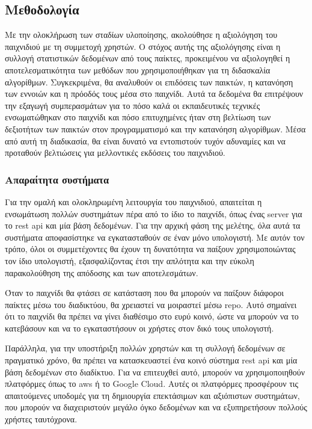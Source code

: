 \subsection{Μεθοδολογία}

Με την ολοκλήρωση των σταδίων υλοποίησης, ακολούθησε η αξιολόγηση του παιχνιδιού με τη συμμετοχή χρηστών. Ο στόχος αυτής της αξιολόγησης είναι η συλλογή στατιστικών δεδομένων από τους παίκτες, προκειμένου να αξιολογηθεί η αποτελεσματικότητα των μεθόδων που χρησιμοποιήθηκαν για τη διδασκαλία αλγορίθμων. Συγκεκριμένα, θα αναλυθούν οι επιδόσεις των παικτών, η κατανόηση των εννοιών και η πρόοδός τους μέσα στο παιχνίδι. Αυτά τα δεδομένα θα επιτρέψουν την εξαγωγή συμπερασμάτων για το πόσο καλά οι εκπαιδευτικές τεχνικές ενσωματώθηκαν στο παιχνίδι και πόσο επιτυχημένες ήταν στη βελτίωση των δεξιοτήτων των παικτών στον προγραμματισμό και την κατανόηση αλγορίθμων. Μέσα από αυτή τη διαδικασία, θα είναι δυνατό να εντοπιστούν τυχόν αδυναμίες και να προταθούν βελτιώσεις για μελλοντικές εκδόσεις του παιχνιδιού.

\subsubsection{Απαραίτητα συστήματα}

Για την ομαλή και ολοκληρωμένη λειτουργία του παιχνιδιού, απαιτείται η ενσωμάτωση πολλών συστημάτων πέρα από το ίδιο το παιχνίδι, όπως ένας \gls{server} για το \acrshort{rest} \acrshort{api} και μία βάση δεδομένων. Για την αρχική φάση της μελέτης, όλα αυτά τα συστήματα αποφασίστηκε να εγκατασταθούν σε έναν μόνο υπολογιστή. Με αυτόν τον τρόπο, όλοι οι συμμετέχοντες θα έχουν τη δυνατότητα να παίξουν χρησιμοποιώντας τον ίδιο υπολογιστή, εξασφαλίζοντας έτσι την απλότητα και την εύκολη παρακολούθηση της απόδοσης και των αποτελεσμάτων.

Όταν το παιχνίδι θα φτάσει σε κατάσταση που θα μπορούν να παίξουν διάφοροι παίκτες μέσω του διαδικτύου, θα χρειαστεί να μοιραστεί μέσω \gls{repo}. Αυτό σημαίνει ότι το παιχνίδι θα πρέπει να γίνει διαθέσιμο στο ευρύ κοινό, ώστε να μπορούν να το κατεβάσουν και να το εγκαταστήσουν οι χρήστες στον δικό τους υπολογιστή.

Παράλληλα, για την υποστήριξη πολλών χρηστών και τη συλλογή δεδομένων σε πραγματικό χρόνο, θα πρέπει να κατασκευαστεί ένα κοινό σύστημα \acrshort{rest} \acrshort{api} και μία βάση δεδομένων στο διαδίκτυο. Για να επιτευχθεί αυτό, μπορούν να χρησιμοποιηθούν πλατφόρμες όπως το \acrshort{aws}\cite{noauthor_cloud_nodate} ή το Google Cloud\cite{noauthor_cloud_nodate-1}. Αυτές οι πλατφόρμες προσφέρουν τις απαιτούμενες υποδομές για τη δημιουργία επεκτάσιμων και αξιόπιστων συστημάτων, που μπορούν να διαχειριστούν μεγάλο όγκο δεδομένων και να εξυπηρετήσουν πολλούς χρήστες ταυτόχρονα.

